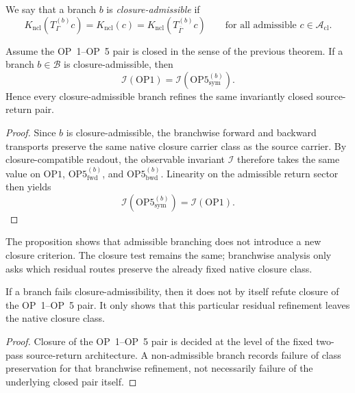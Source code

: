 We say that a branch $b$ is \emph{closure-admissible} if
\[
K_{\mathrm{ncl}}(T_{\Gamma}^{(b)}c)
=
K_{\mathrm{ncl}}(c)
=
K_{\mathrm{ncl}}(T_{\overline{\Gamma}}^{(b)}c)
\qquad
\text{for all admissible } c\in\mathcal{A}_{\mathrm{cl}}.
\]

\begin{proposition}\label{prop:op-branchwise-refinement}
Assume the OP~1--OP~5 pair is closed in the sense of the previous theorem. If a branch $b\in\mathcal{B}$ is closure-admissible, then
\[
\mathcal{I}(\mathrm{OP1})
=
\mathcal{I}(\mathrm{OP5}^{(b)}_{\mathrm{sym}}).
\]
Hence every closure-admissible branch refines the same invariantly closed source-return pair.
\end{proposition}

\begin{proof}
Since $b$ is closure-admissible, the branchwise forward and backward transports preserve the same native closure carrier class as the source carrier. By closure-compatible readout, the observable invariant $\mathcal{I}$ therefore takes the same value on $\mathrm{OP1}$, $\mathrm{OP5}^{(b)}_{\mathrm{fwd}}$, and $\mathrm{OP5}^{(b)}_{\mathrm{bwd}}$. Linearity on the admissible return sector then yields
\[
\mathcal{I}(\mathrm{OP5}^{(b)}_{\mathrm{sym}})
=
\mathcal{I}(\mathrm{OP1}).
\]
\end{proof}

\begin{remark}
The proposition shows that admissible branching does not introduce a new closure criterion. The closure test remains the same; branchwise analysis only asks which residual routes preserve the already fixed native closure class.
\end{remark}

\begin{corollary}
If a branch fails closure-admissibility, then it does not by itself refute closure of the OP~1--OP~5 pair. It only shows that this particular residual refinement leaves the native closure class.
\end{corollary}

\begin{proof}
Closure of the OP~1--OP~5 pair is decided at the level of the fixed two-pass source-return architecture. A non-admissible branch records failure of class preservation for that branchwise refinement, not necessarily failure of the underlying closed pair itself.
\end{proof}

